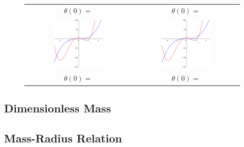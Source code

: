 \documentclass[11pt]{article} %
\begin{document}
\begin{figure}
\begin{tabular}{c c}
$\theta(0) = $ & $\theta(0) = $ \\[6pt]
 \includegraphics[width=0.5\textwidth]{problem1plot2.png} &  \includegraphics[width=0.5\textwidth]{problem1plot2.png} \\
$\theta(0) = $ & $\theta(0) = $ \\[6pt]

\end{tabular}
\end{figure}

\subsection*{Dimensionless Mass}

\subsection*{Mass-Radius Relation}
\end{document}
